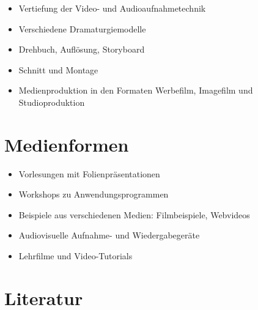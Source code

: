 \begin{itemize}
\tightlist
\item
  Vertiefung der Video- und Audioaufnahmetechnik
\item
  Verschiedene Dramaturgiemodelle
\item
  Drehbuch, Auflösung, Storyboard
\item
  Schnitt und Montage
\item
  Medienproduktion in den Formaten Werbefilm, Imagefilm und
  Studioproduktion
\end{itemize}

\hypertarget{medienformenpathlabelmi-2017modulbeschreibungen-bachelorba_vc-audiovisuelles-medienprojekt-2}{%
\section*{Medienformen\label{/mi-2017/modulbeschreibungen-bachelor/BA_VC-audiovisuelles-medienprojekt-2}}\label{medienformenpathlabelmi-2017modulbeschreibungen-bachelorba_vc-audiovisuelles-medienprojekt-2}}

\begin{itemize}
\tightlist
\item
  Vorlesungen mit Folienpräsentationen
\item
  Workshops zu Anwendungsprogrammen
\item
  Beispiele aus verschiedenen Medien: Filmbeispiele, Webvideos
\item
  Audiovisuelle Aufnahme- und Wiedergabegeräte
\item
  Lehrfilme und Video-Tutorials
\end{itemize}

\hypertarget{literaturpathlabelmi-2017modulbeschreibungen-bachelorba_vc-audiovisuelles-medienprojekt-2}{%
\section*{Literatur\label{/mi-2017/modulbeschreibungen-bachelor/BA_VC-audiovisuelles-medienprojekt-2}}\label{literaturpathlabelmi-2017modulbeschreibungen-bachelorba_vc-audiovisuelles-medienprojekt-2}}

